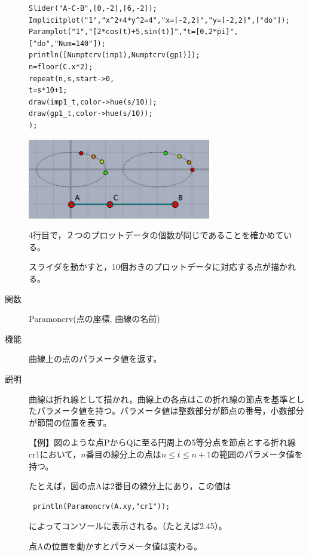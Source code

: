 \documentclass[papersize,a4paper,12pt,uplatex]{jsarticle}
\begin{document}
\begin{description}
\begin{verbatim}
Slider("A-C-B",[0,-2],[6,-2]);
Implicitplot("1","x^2+4*y^2=4","x=[-2,2]","y=[-2,2]",["do"]);
Paramplot("1","[2*cos(t)+5,sin(t)]","t=[0,2*pi]",["do","Num=140"]);
println([Numptcrv(imp1),Numptcrv(gp1)]);
n=floor(C.x*2);
repeat(n,s,start->0,
t=s*10+1;
draw(imp1_t,color->hue(s/10));
draw(gp1_t,color->hue(s/10));
);
\end{verbatim}

\begin{center}
\includegraphics[bb=0.00 0.00 305.02 133.01,width=8cm]{Fig/numptcrv.pdf}
\end{center}

4行目で，２つのプロットデータの個数が同じであることを確かめている。

スライダを動かすと，10個おきのプロットデータに対応する点が描かれる。

\vspace{\baselineskip}
\hypertarget{paramoncrv}{}
\item[関数]Paramoncrv(点の座標, 曲線の名前)
\item[機能]曲線上の点のパラメータ値を返す。
\item[説明]曲線は折れ線として描かれ，曲線上の各点はこの折れ線の節点を基準としたパラメータ値を持つ。パラメータ値は整数部分が節点の番号，小数部分が節間の位置を表す。

\vspace{\baselineskip}
【例】図のような点PからQに至る円周上の5等分点を節点とする折れ線cr1において，$n$番目の線分上の点は$n\leq t\leq n+1$の範囲のパラメータ値を持つ。

たとえば，図の点$\mathrm{A}$は2番目の線分上にあり，この値は

\begin{verbatim}
 println(Paramoncrv(A.xy,"cr1"));
\end{verbatim}

によってコンソールに表示される。（たとえば2.45）。

点Aの位置を動かすとパラメータ値は変わる。

\vspace{\baselineskip}
\begin{center}
 
\end{center}


\end{description}
\end{document}
